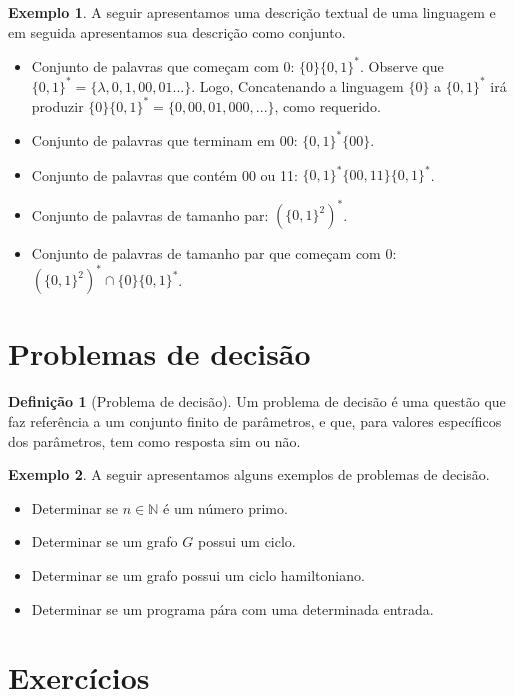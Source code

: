 \documentclass[a4paper]{article}
\theoremstyle{definition}
\newtheorem{Example}{Exemplo}
\newtheorem{Definition}{Definição}
\begin{document}
  \begin{Example}
    A seguir apresentamos uma descrição textual de uma linguagem
    e em seguida apresentamos sua descrição como conjunto.
    \begin{itemize}
      \item Conjunto de palavras que começam com 0: $\{0\}\{0,1\}^*$.
            Observe que $\{0,1\}^*=\{\lambda,0,1,00,01...\}$. Logo,
            Concatenando a linguagem $\{0\}$ a $\{0,1\}^*$ irá produzir
            $\{0\}\{0,1\}^* = \{0,00,01, 000, ...\}$, como requerido.
      \item Conjunto de palavras que terminam em 00: $\{0,1\}^*\{00\}$.
      \item Conjunto de palavras que contém 00 ou 11:
        $\{0,1\}^*\{00,11\}\{0,1\}^*$.
      \item Conjunto de palavras de tamanho par: $(\{0,1\}^2)^*$.
      \item Conjunto de palavras de tamanho par que começam com 0:
            $(\{0,1\}^2)^* \cap \{0\}\{0,1\}^*$.
    \end{itemize}
  \end{Example}


  \section{Problemas de decisão}

  \begin{Definition}[Problema de decisão]
    Um problema de decisão é uma questão que faz referência a um
    conjunto finito de parâmetros, e que, para valores específicos dos
    parâmetros, tem como resposta sim ou não.
  \end{Definition}

  \begin{Example}
    A seguir apresentamos alguns exemplos de problemas de decisão.
    \begin{itemize}
      \item Determinar se $n \in \mathbb{N}$ é um número primo.
      \item Determinar se um grafo $G$ possui um ciclo.
      \item Determinar se um grafo possui um ciclo hamiltoniano.
      \item Determinar se um programa pára com uma determinada entrada.
    \end{itemize}
  \end{Example}

  \section{Exercícios}
\end{document}
